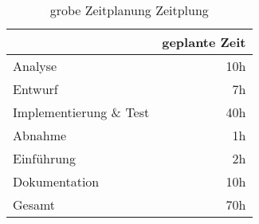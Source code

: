\begin{table}[h]
\centering
\begin{tabular}{lr}
\rowcolor{gragreen}\multicolumn{1}{l}{\bf{Projektphase}}  & \multicolumn{1}{l}{\bf{geplante Zeit}} \\
\hline
Analyse   & 10h \\

\rowcolor{odd}Entwurf   & 7h \\

Implementierung \& Test &  40h \\

\rowcolor{odd}Abnahme &   1h \\
Einführung   & 2h \\
\rowcolor{odd}Dokumentation   & 10h \\

\hline
\rowcolor{heading}Gesamt  & 70h
\end{tabular}
\caption{grobe Zeitplanung Zeitplung}
\label{table:overviewtimetable}
\end{table}